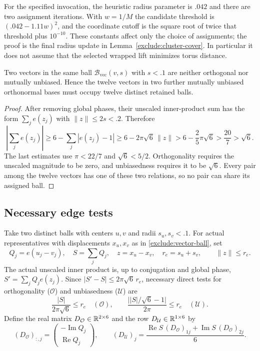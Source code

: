 For the specified invocation, the heuristic radius parameter is $.042$ and
there are two assignment iterations.  With $w=1/M$ the candidate
threshold is $(.042-1.11w)^2$, and the coordinate cutoff is the square
root of twice that threshold plus $10^{-10}$.  These constants affect
only the choice of assignments; the proof is the final radius update
in Lemma~\ref{exclude:cluster-cover}.  In particular it does not assume
that the selected wrapped lift minimizes torus distance.

\begin{lemma}
\label{exclude:distinct-labels}
Two vectors in the same ball $\mathcal B_{\mathrm{vec}}(v,s)$ with $s<.1$ are neither
orthogonal nor mutually unbiased.  Hence the twelve vectors in two
further mutually unbiased orthonormal bases must occupy twelve
distinct retained balls.
\end{lemma}
\begin{proof}
After removing global phases, their unscaled inner-product sum has
the form $\sum_j e(z_j)$ with $\|z\|\le2s<.2$.  Therefore
\[
 \left|\sum_j e(z_j)\right|
 \ge6-\sum_j|e(z_j)-1|
 \ge6-2\pi\sqrt6\,\|z\|
 >6-\frac25\pi\sqrt6>\frac{20}{7}>\sqrt6.
\]
The last estimates use $\pi<22/7$ and $\sqrt6<5/2$.
Orthogonality requires the unscaled magnitude to be zero, and
unbiasedness requires it to be $\sqrt6$.
Every pair among the twelve vectors has one of these two relations,
so no pair can share its assigned ball.
\end{proof}

\subsection{Necessary edge tests}

Take two distinct balls with centers $u,v$ and radii $s_u,s_v<.1$.
For actual representatives with displacements $x_u,x_v$ as in
\eqref{exclude:vector-ball}, set
\begin{equation}
 Q_j=e(u_j-v_j),\quad S=\sum_jQ_j,\quad
 z=x_u-x_v,\quad r_e=s_u+s_v,
 \qquad \|z\|\le r_e.
 \label{exclude:edge-data}
\end{equation}
The actual unscaled inner product is, up to conjugation and global
phase, $S' =\sum_j Q_je(z_j)$.
Since $|S'-S|\le2\pi\sqrt6\,r_e$, necessary direct tests for
orthogonality ($\mathcal O$) and unbiasedness ($\mathcal U$) are
\begin{equation}
 \frac{|S|}{2\pi\sqrt6}\le r_e\quad(\mathcal O),\qquad
 \frac{\bigl||S|/\sqrt6-1\bigr|}{2\pi}\le r_e\quad(\mathcal U).
 \label{exclude:edge-distance}
\end{equation}
Define the real matrix $D_{\mathcal O}\in\mathbb R^{2\times6}$ and the row
$D_{\mathcal U}\in\mathbb R^{1\times6}$ by
\begin{equation}
 (D_{\mathcal O})_{:,j}=
 \begin{pmatrix}-\operatorname{Im}Q_j\\ \operatorname{Re}Q_j\end{pmatrix},
 \qquad
 (D_{\mathcal U})_j=
 \frac{\operatorname{Re}S\,(D_{\mathcal O})_{1j}
       +\operatorname{Im}S\,(D_{\mathcal O})_{2j}}6.
 \label{exclude:edge-derivatives}
\end{equation}

